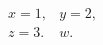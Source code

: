 \documentclass{article}
\begin{document}
\[\begin{array}{ll} x=1, & y=2,\\ z=3. & w.\end{array}\]
\end{document}
